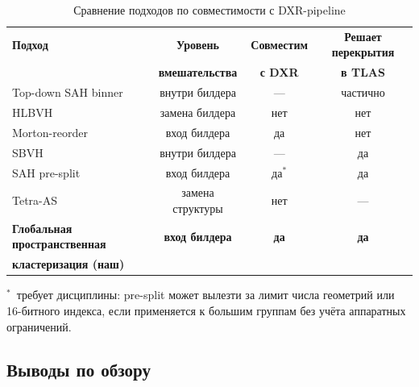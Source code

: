 \begin{table}[H]
\centering
\caption{Сравнение подходов по совместимости с DXR-pipeline}
\label{tab:related_work}
\small
\begin{tabular}{lccc}
\hline
\textbf{Подход} & \textbf{Уровень} & \textbf{Совместим} & \textbf{Решает перекрытия} \\
& \textbf{вмешательства} & \textbf{с DXR} & \textbf{в TLAS} \\
\hline
Top-down SAH binner~\cite{wald2007} & внутри билдера & --- & частично \\
HLBVH~\cite{HLBVH} & замена билдера & нет & нет \\
Morton-reorder & вход билдера & да & нет \\
SBVH~\cite{stich2009} & внутри билдера & --- & да \\
SAH pre-split~\cite{ganestam16_splitting} & вход билдера & да$^*$ & да \\
Tetra-AS~\cite{tetra2021} & замена структуры & нет & --- \\
\textbf{Глобальная пространственная} & \textbf{вход билдера} & \textbf{да} & \textbf{да} \\
\textbf{кластеризация (наш)} & & & \\
\hline
\end{tabular}

\vspace{0.5em}
\raggedright\footnotesize
$^*$~требует дисциплины: pre-split может вылезти за лимит числа
геометрий или 16-битного индекса, если применяется к большим
группам без учёта аппаратных ограничений.
\end{table}

\subsection{Выводы по обзору}

